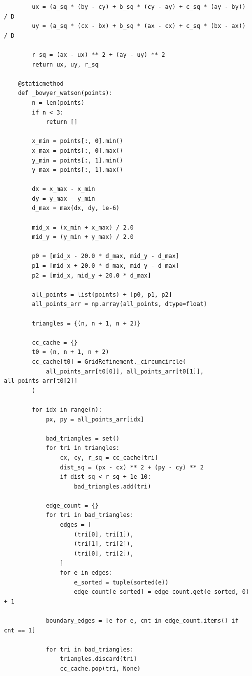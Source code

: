 \documentclass[a4paper, 14pt]{extarticle}
\begin{document}
\begin{longlisting}
\begin{verbatim}
        ux = (a_sq * (by - cy) + b_sq * (cy - ay) + c_sq * (ay - by)) / D
        uy = (a_sq * (cx - bx) + b_sq * (ax - cx) + c_sq * (bx - ax)) / D

        r_sq = (ax - ux) ** 2 + (ay - uy) ** 2
        return ux, uy, r_sq

    @staticmethod
    def _bowyer_watson(points):
        n = len(points)
        if n < 3:
            return []

        x_min = points[:, 0].min()
        x_max = points[:, 0].max()
        y_min = points[:, 1].min()
        y_max = points[:, 1].max()

        dx = x_max - x_min
        dy = y_max - y_min
        d_max = max(dx, dy, 1e-6)

        mid_x = (x_min + x_max) / 2.0
        mid_y = (y_min + y_max) / 2.0

        p0 = [mid_x - 20.0 * d_max, mid_y - d_max]
        p1 = [mid_x + 20.0 * d_max, mid_y - d_max]
        p2 = [mid_x, mid_y + 20.0 * d_max]

        all_points = list(points) + [p0, p1, p2]
        all_points_arr = np.array(all_points, dtype=float)

        triangles = {(n, n + 1, n + 2)}

        cc_cache = {}
        t0 = (n, n + 1, n + 2)
        cc_cache[t0] = GridRefinement._circumcircle(
            all_points_arr[t0[0]], all_points_arr[t0[1]], all_points_arr[t0[2]]
        )

        for idx in range(n):
            px, py = all_points_arr[idx]

            bad_triangles = set()
            for tri in triangles:
                cx, cy, r_sq = cc_cache[tri]
                dist_sq = (px - cx) ** 2 + (py - cy) ** 2
                if dist_sq < r_sq + 1e-10:
                    bad_triangles.add(tri)

            edge_count = {}
            for tri in bad_triangles:
                edges = [
                    (tri[0], tri[1]),
                    (tri[1], tri[2]),
                    (tri[0], tri[2]),
                ]
                for e in edges:
                    e_sorted = tuple(sorted(e))
                    edge_count[e_sorted] = edge_count.get(e_sorted, 0) + 1

            boundary_edges = [e for e, cnt in edge_count.items() if cnt == 1]

            for tri in bad_triangles:
                triangles.discard(tri)
                cc_cache.pop(tri, None)


\end{verbatim}
\end{longlisting}
\end{document}
